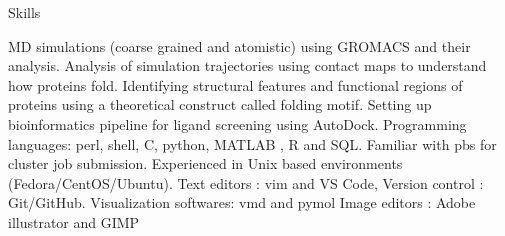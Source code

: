 
\begin{rubric}{Skills}

\entry* MD simulations (coarse grained and atomistic) using GROMACS and their analysis.
\entry*Analysis of simulation trajectories using contact maps to understand how proteins fold.
\entry*Identifying structural features and functional regions of proteins using a theoretical construct called folding motif.
\entry*Setting up bioinformatics pipeline for ligand screening using AutoDock.
\entry*Programming languages: perl, shell, C, python, MATLAB , R and SQL.
\entry*Familiar with pbs for cluster job submission.
\entry*Experienced in Unix based environments (Fedora/CentOS/Ubuntu).
\entry*Text editors : vim and VS Code, Version control : Git/GitHub.
\entry*Visualization softwares: vmd and pymol
\entry*Image editors : Adobe illustrator and GIMP
\end{rubric}
